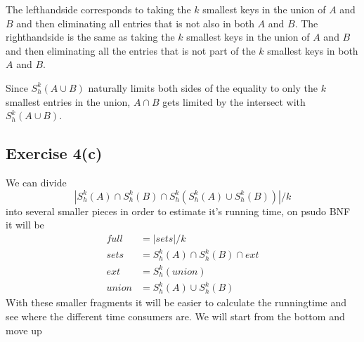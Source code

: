The lefthandside corresponds to taking the $k$ smallest keys in the union of
$A$ and $B$ and then eliminating all entries that is not also in both $A$ and
$B$.
%
The righthandside is the same as taking the $k$ smallest keys in the union of
$A$ and $B$ and then eliminating all the entries that is not part of the $k$
smallest keys in both $A$ and $B$.

Since $S^{k}_{h}(A \cup B)$ naturally limits both sides of the equality to only
the $k$ smallest entries in the union, $A \cap B$ gets limited by the intersect
with $S^{k}_{h}(A \cup B)$.


\subsection{Exercise 4(c)}
We can divide
\[
|S^{k}_{h}(A) \cap S^{k}_{h}(B) \cap S^{k}_{h}(S^{k}_{h}(A) \cup S^{k}_{h}(B))|
/ k
\]
%
into several smaller pieces in order to estimate it's running time, on psudo BNF
it will be
\begin{align*}
  full  &= |sets| / k \\
  sets  &= S^{k}_{h}(A) \cap S^{k}_{h}(B) \cap ext \\
  ext   &= S^{k}_{h}(union) \\
  union &= S^{k}_{h}(A) \cup S^{k}_{h}(B)
\end{align*}
With these smaller fragments it will be easier to calculate the runningtime and
see where the different time consumers are. We will start from the bottom and
move up
